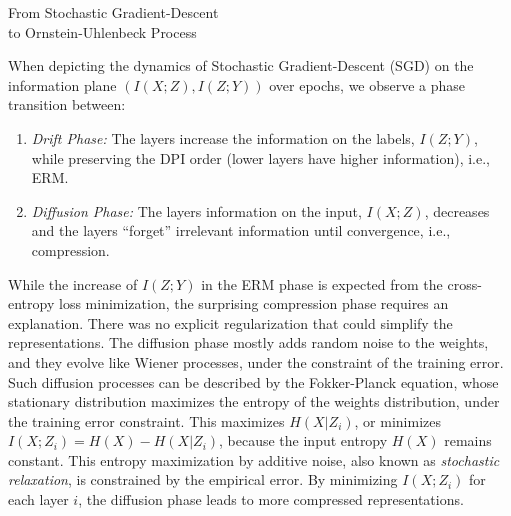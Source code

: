 \documentclass[11pt]{article}
\begin{document}
	
\begin{center}
{\LARGE From Stochastic Gradient-Descent\\
	\vspace{5pt}to Ornstein-Uhlenbeck Process} 
\end{center}

When depicting the dynamics of Stochastic Gradient-Descent (SGD) on the information plane $(I(X;Z),I(Z;Y))$ over epochs, we observe a phase transition between:

\begin{enumerate}
	\item \emph{Drift Phase:} The layers increase the information on the labels, $I(Z;Y)$, while preserving the DPI order (lower layers have higher information), i.e., ERM.
	\item \emph{Diffusion Phase:} The layers information on the input, $I(X;Z)$, decreases and the layers ``forget'' irrelevant information until convergence, i.e., compression.
\end{enumerate}

While the increase of $I(Z;Y)$ in the ERM phase is expected from the cross-entropy loss minimization, the surprising compression phase requires an explanation. There was no explicit regularization that could simplify the representations. The diffusion phase mostly adds random noise to the weights, and they evolve like Wiener processes, under the constraint of the training error. Such diffusion processes can be described by the Fokker-Planck equation, whose stationary distribution maximizes the entropy of the weights distribution, under the training error constraint. This maximizes $H(X\vert Z_i)$, or minimizes $I(X;Z_i) = H(X) - H(X\vert Z_i)$, because the input entropy $H(X)$ remains constant. This entropy maximization by additive noise, also known as \emph{stochastic relaxation}, is constrained by the empirical error. By minimizing $I(X;Z_i)$ for each layer $i$, the diffusion phase leads to more compressed representations.
\end{document}
